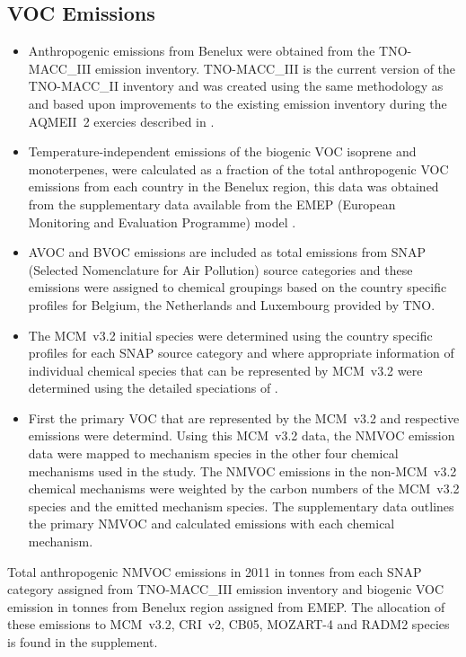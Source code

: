 \subsection{VOC Emissions} \label{ss:VOC_emissions}
\begin{itemize}
    \item Anthropogenic emissions from Benelux were obtained from the TNO-MACC\_III emission inventory. TNO-MACC\_III is the current version of the TNO-MACC\_II inventory and was created using the same methodology as \citet{Kuenen:2014} and based upon improvements to the existing emission inventory during the AQMEII~2 exercies described in \citet{Pouliot:2015}. 
    \item Temperature-independent emissions of the biogenic VOC isoprene and monoterpenes, were calculated as a fraction of the total anthropogenic VOC emissions from each country in the Benelux region, this data was obtained from the supplementary data available from the EMEP (European Monitoring and Evaluation Programme) model \citep{Simpson:2012}.
    \item AVOC and BVOC emissions are included as total emissions from SNAP (Selected Nomenclature for Air Pollution) source categories and these emissions were assigned to chemical groupings based on the country specific profiles for Belgium, the Netherlands and Luxembourg provided by TNO.
    \item The MCM~v3.2 initial species were determined using the country specific profiles for each SNAP source category and where appropriate information of individual chemical species that can be represented by MCM~v3.2 were determined using the detailed speciations of \citet{Passant:2002}. %
    \item First the primary VOC that are represented by the MCM~v3.2 and respective emissions were determind. Using this MCM~v3.2 data, the NMVOC emission data were mapped to mechanism species in the other four chemical mechanisms used in the study. The NMVOC emissions in the non-MCM~v3.2 chemical mechanisms were weighted by the carbon numbers of the MCM~v3.2 species and the emitted mechanism species. The supplementary data outlines the primary NMVOC and calculated emissions with each chemical mechanism.
\end{itemize}
{%
    \renewcommand{\arraystretch}{1.1}%
    \begin{table}%
        \centering%
        \caption{Total anthropogenic NMVOC emissions in 2011 in tonnes from each SNAP category assigned from TNO-MACC\_III emission inventory and biogenic VOC emission in tonnes from Benelux region assigned from EMEP. The allocation of these emissions to MCM~v3.2, CRI~v2, CB05, MOZART-4 and RADM2 species is found in the supplement.}%
        
    \end{table}%
}
{
    \begin{landscape}%
        \centering%
    \end{landscape}%
}

